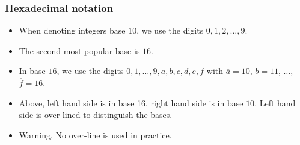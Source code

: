 \begin{frame}
\frametitle{Hexadecimal notation}
\begin{itemize}
\item When denoting integers base $10$, we use the digits $0, 1,2,\dots, 9$.
\item The second-most popular base is $16$. 
\item In base $16$, we use the digits $\overline {0,1,\dots, 9, a, b, c, d, e, f}$ with
$\overline {a} = 10$, $\overline {b} = 11$, $\dots$, $\overline {f} = 16$. 
\item Above, left hand side is in base 16, right hand side is in base $10$. Left hand side is over-lined to distinguish the bases. 
\item \alert<1->{Warning.} No over-line is used in practice.
\end{itemize}
\begin{example}

\end{example}
\end{frame}